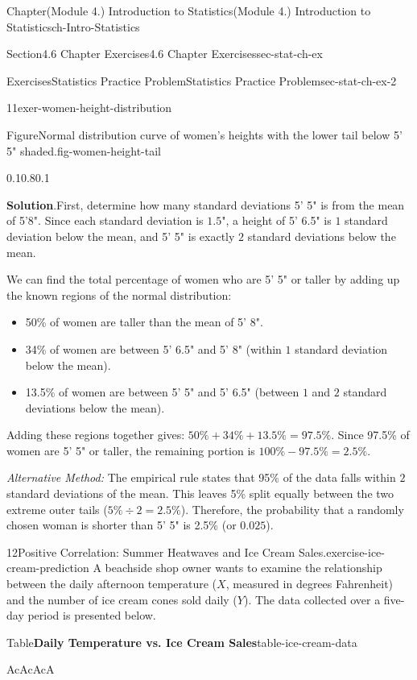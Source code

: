 \documentclass[oneside,10pt,]{book}
\newcommand{\blocktitlefont}{\relax}
\newcommand{\tabularfont}{\relax}
\newcommand{\ptxlistdisc}{\raisebox{0.3ex}{\textbullet}}
\newcommand{\hrulethin}  {\noalign{\hrule height 0.04em}}
\begin{document}
\begin{chapterptx}{Chapter}{(Module 4.) Introduction to Statistics}{}{(Module 4.) Introduction to Statistics}{}{}{ch-Intro-Statistics}
\begin{sectionptx}{Section}{4.6 Chapter Exercises}{}{4.6 Chapter Exercises}{}{}{sec-stat-ch-ex}
\begin{exercises-subsection-numberless}{Exercises}{Statistics Practice Problem}{}{Statistics Practice Problem}{}{}{sec-stat-ch-ex-2}
\begin{divisionexercise}{11}{}{}{exer-women-height-distribution}
\begin{figureptx}{Figure}{Normal distribution curve of women's heights with the lower tail below 5' 5" shaded.}{fig-women-height-tail}{}
\begin{image}{0.1}{0.8}{0.1}{}
{\begin{tikzpicture}[x=1.2cm, y=10cm]
\end{tikzpicture}%
}%
\end{image}%
\tcblower
\end{figureptx}%
\par\smallskip%
\noindent\textbf{\blocktitlefont Solution}.\hypertarget{exer-women-height-distribution-2}{}\quad{}First, determine how many standard deviations 5' 5" is from the mean of 5'8". Since each standard deviation is \(1.5\)", a height of 5' 6.5" is \(1\) standard deviation below the mean, and 5' 5" is exactly \(2\) standard deviations below the mean.%
\par
We can find the total percentage of women who are 5' 5" or taller by adding up the known regions of the normal distribution:%
%
\begin{itemize}[label=\ptxlistdisc]
\item{}50\% of women are taller than the mean of 5' 8".%
\item{}34\% of women are between 5' 6.5" and 5' 8" (within \(1\) standard deviation below the mean).%
\item{}13.5\% of women are between 5' 5" and 5' 6.5" (between \(1\) and \(2\) standard deviations below the mean).%
\end{itemize}
Adding these regions together gives: \(50\% + 34\% + 13.5\% = 97.5\%\). Since 97.5\% of women are 5' 5" or taller, the remaining portion is \(100\% - 97.5\% = 2.5\%\).%
\par
\emph{Alternative Method:} The empirical rule states that 95\% of the data falls within \(2\) standard deviations of the mean. This leaves 5\% split equally between the two extreme outer tails (\(5\% \div 2 = 2.5\%\)). Therefore, the probability that a randomly chosen woman is shorter than 5' 5" is 2.5\% (or \(0.025\)).%
\end{divisionexercise}%
\begin{divisionexercise}{12}{Positive Correlation: Summer Heatwaves and Ice Cream Sales.}{}{exercise-ice-cream-prediction}%
A beachside shop owner wants to examine the relationship between the daily afternoon temperature (\(X\), measured in degrees Fahrenheit) and the number of ice cream cones sold daily (\(Y\)). The data collected over a five-day period is presented below.%
\begin{tableptx}{Table}{\textbf{Daily Temperature vs. Ice Cream Sales}}{table-ice-cream-data}{}%
\centering%
{\tabularfont%
\begin{tabular}{AcAcAcA}\hrulethin

\end{tabular}}
\end{tableptx}
\end{divisionexercise}
\end{exercises-subsection-numberless}
\end{sectionptx}
\end{chapterptx}
\end{document}
